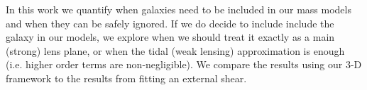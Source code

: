 In this work we quantify when galaxies need to be included in our mass models and when they can be safely ignored. If we do decide to include include the galaxy in our models, we explore when we should treat it exactly as a main (strong) lens plane, or when the tidal (weak lensing) approximation is enough (i.e. higher order terms are non-negligible). We compare the results using our 3-D framework to the results from fitting an external shear.